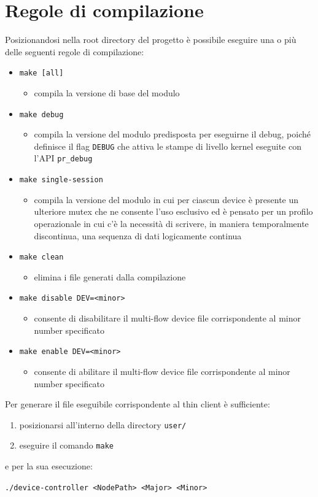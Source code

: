 \documentclass{article}
\begin{document}
\section{Regole di compilazione}
Posizionandosi nella root directory del progetto è possibile eseguire una o più delle seguenti regole di compilazione:
\begin{itemize}
\item \texttt{make [all]}
\begin{itemize}
\item compila la versione di base del modulo
\end{itemize}
\item \texttt{make debug}
\begin{itemize}
\item compila la versione del modulo predisposta per eseguirne il debug, poiché definisce il flag \texttt{DEBUG} che attiva le stampe di livello kernel eseguite con l'API \texttt{pr\_debug}
\end{itemize}
\item \texttt{make single-session}
\begin{itemize}
\item compila la versione del modulo in cui per ciascun device è presente un ulteriore mutex che ne consente l'uso esclusivo ed è pensato per un profilo operazionale in cui c'è la necessità di scrivere, in maniera temporalmente discontinua, una sequenza di dati logicamente continua
\end{itemize}
\item \texttt{make clean}
\begin{itemize}
\item elimina i file generati dalla compilazione
\end{itemize}
\item \texttt{make disable DEV=<minor>}
\begin{itemize}
\item consente di disabilitare il multi-flow device file corrispondente al minor number specificato
\end{itemize}
\item \texttt{make enable DEV=<minor>}
\begin{itemize}
\item consente di abilitare il multi-flow device file corrispondente al minor number specificato
\end{itemize}
\end{itemize}

\newpage
Per generare il file eseguibile corrispondente al thin client è sufficiente:
\begin{enumerate}
\item posizionarsi all'interno della directory \texttt{user/}
\item eseguire il comando \texttt{make}
\end{enumerate}
e per la sua esecuzione:
\begin{center}
\texttt{./device-controller <NodePath> <Major> <Minor>}
\end{center}
\end{document}
